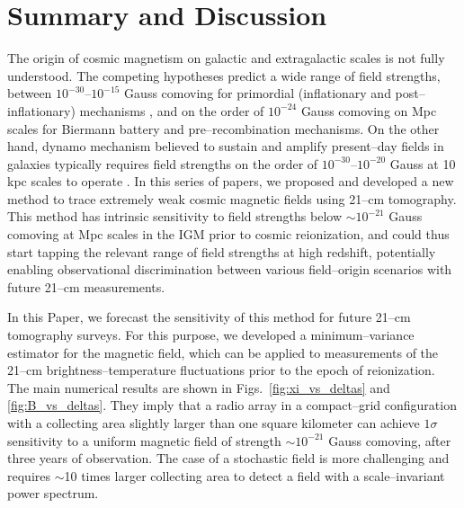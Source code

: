 \section{Summary and Discussion}
\label{sec:conclusions}

The origin of cosmic magnetism on galactic and extragalactic scales is not fully understood. The competing hypotheses predict a wide range of field strengths, between $10^{-30}$--$10^{-15}$ Gauss comoving for primordial (inflationary and post--inflationary) mechanisms \cite{2013A&ARv..21...62D,2014JCAP...05..040K}, and on the order of $10^{-24}$ Gauss comoving on Mpc scales for Biermann battery \cite{Naoz13} and pre--recombination \cite{2006Sci...311..827I} mechanisms. On the other hand, dynamo mechanism believed to sustain and amplify present--day fields in galaxies typically requires field strengths on the order of $10^{-30}$--$10^{-20}$ Gauss at 10 kpc scales to operate \cite{2001PhLB..501..165D,2002RvMP...74..775W,2006Sci...311..827I}. In this series of papers, we proposed and developed a new method to trace extremely weak cosmic magnetic fields using 21--cm tomography. This method has intrinsic sensitivity to field strengths below $\sim$$10^{-21}$ Gauss comoving at Mpc scales in the IGM prior to cosmic reionization, and could thus start tapping the relevant range of field strengths at high redshift, potentially enabling observational discrimination between various field--origin scenarios with future 21--cm measurements.

In this Paper, we forecast the sensitivity of this method for future 21--cm tomography surveys. For this purpose, we developed a minimum--variance estimator for the magnetic field, which can be applied to measurements of the 21--cm brightness--temperature fluctuations prior to the epoch of reionization. The main numerical results are shown in Figs.~\ref{fig:xi_vs_deltas} and \ref{fig:B_vs_deltas}. They imply that a radio array in a compact--grid configuration with a collecting area slightly larger than one square kilometer can achieve $1\sigma$ sensitivity to a uniform magnetic field of strength $\sim$$10^{-21}$ Gauss comoving, after three years of observation. The case of a stochastic field is more challenging and requires $\sim$10 times larger collecting area to detect a field with a scale--invariant power spectrum. 


